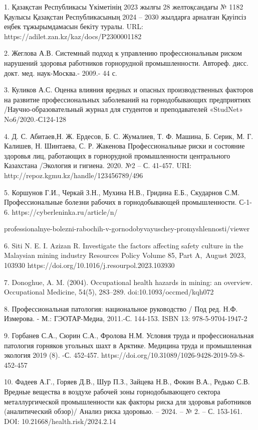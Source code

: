 \begin{noparindent}
1. Қазақстан Республикасы Үкіметінің 2023 жылғы 28 желтоқсандағы № 1182
Қаулысы Қазақстан Республикасының 2024 -- 2030 жылдарға арналған
Қауіпсіз еңбек тұжырымдамасын бекіту туралы. URL:
https://adilet.zan.kz/kaz/docs/P2300001182

2. Жеглова А\emph{.}В\emph{.} Системный подход к управлению
профессиональным риском нарушений здоровья работников горнорудной
промышленности. Автореф. дисс. докт. мед. наук-Москва.- 2009.- 44 с.

3. Куликов А.С. Оценка влияния вредных и опасных производственных
факторов на развитие профессиональных заболеваний на горнодобывающих
предприятиях /Научно-образовательный журнал для студентов и
преподавателей «StudNet» No6/2020.-С124-128

4. Д. С. Абитаев,Н. Ж. Ердесов, Б. С. Жумалиев, Т. Ф. Машина, Б. Серик,
М. Г. Калишев, Н. Шинтаева, С. Р. Жакенова Профессиональные риски и
состояние здоровья лиц, работающих в горнорудной промышленности
центрального Казахстана /Экология и гигиена. 2020. №2 -- С. 41-457. URI:
http://repoz.kgmu.kz/handle/123456789/496

5. Коршунов Г.И., Черкай З.Н., Мухина Н.В., Гридина Е.Б., Скударнов С.М.
Профессиональные болезни рабочих в горнодобывающей промышленности.
С-1-6. https://cyberleninka.ru/article/n/

professionalnye-bolezni-rabochih-v-gornodobyvayuschey-promyshlennosti/viewer

6. Siti N. E. I. Azizan R. Investigate the factors affecting safety
culture in the Malaysian mining industry Resources Policy Volume 85,
Part A,~August 2023, 103930
https://doi.org/10.1016/j.resourpol.2023.103930

7. Donoghue, A. M. (2004). Occupational health hazards in mining: an
overview. Occupational Medicine, 54(5), 283--289.
doi:10.1093/occmed/kqh072~

8. Профессиональная патология: национальное руководство / Под ред. Н.Ф.
Измерова. - М.: ГЭОТАР-Медиа, 2011.-С. 144-153. ISBN 13:
978-5-9704-1947-2

9. Горбанев С.А., Сюрин С.А., Фролова Н.М. Условия труда и
профессиональная патология горняков угольных шахт в Арктике. Медицина
труда и промышленная экология 2019 (8). -С. 452-457.
https://doi.org/10.31089/1026-9428-2019-59-8-452-457

10. Фадеев А.Г., Горяев Д.В., Шур П.З., Зайцева Н.В., Фокин В.А., Редько
С.В. Вредные вещества в воздухе рабочей зоны горнодобывающего сектора
металлургической промышленности как факторы риска для здоровья
работников (аналитический обзор)/ Анализ риска здоровью. -- 2024. -- №
2. -- С. 153-161. DOI: 10.21668/health.risk/2024.2.14
\end{noparindent}


